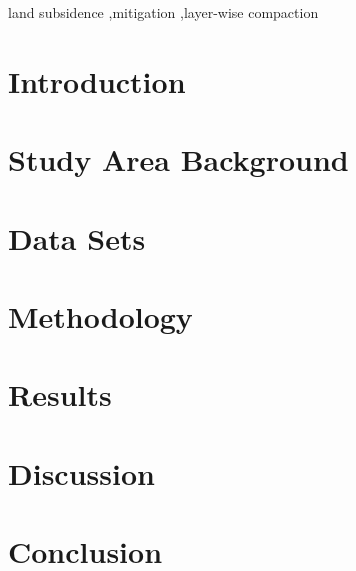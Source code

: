 \documentclass[a4paper,fleqn]{cas-dc}
\begin{document}
	\begin{keywords}
		land subsidence \sep mitigation \sep layer-wise compaction
	\end{keywords}
	
	\maketitle
	
	\linenumbers
	
	\section{Introduction}
	\label{sec:intro}
	
	\section{Study Area Background}
	\label{sec:studyarea}
	
	
	\section{Data Sets}
	\label{sec:dataset}
	
	
	\section{Methodology}
	\label{sec:method}
	
	
	\section{Results}
	\label{sec:result}
	
	\section{Discussion}
	\label{sec:discuss}
	
	\section{Conclusion}
	\label{sec:conclusion}
	
	
\end{document}
